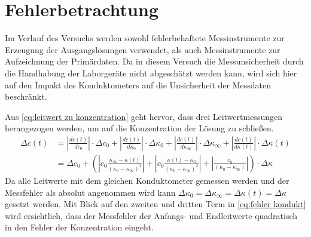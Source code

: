 	\section{Fehlerbetrachtung}
		Im Verlauf des Versuchs werden sowohl fehlerbehaftete Messinstrumente zur Erzeugung der Ausgangslösungen verwendet,
		als auch Messinstrumente zur Aufzeichnung der Primärdaten. Da in diesem Versuch die Messunsicherheit durch die Handhabung
		der Laborgeräte nicht abgeschätzt werden kann, wird sich hier auf den Impakt des Konduktometers auf die Unsicherheit der
		Messdaten beschränkt.\par\medskip
		Aus \cref{eq:leitwert zu konzentration} geht hervor, dass drei Leitwertmessungen herangezogen werden, um auf die Konzentration
		der Lösung zu schließen.
		\begin{align}
			\Delta c(t) &= \left|\frac{dc(t)}{dc_0}\right| \cdot \Delta c_0 + \left| \frac{dc(t)}{d\kappa_0} \right| \cdot \Delta \kappa_0 + \left| \frac{dc(t)}{d\kappa_{\infty}} \right| \cdot \Delta \kappa_{\infty} + \left| \frac{dc(t)}{d\kappa(t)} \right| \cdot \Delta \kappa(t) \nonumber \\
						&= \Delta c_0 + \left( \left| c_0 \frac{\kappa_{\infty} - \kappa(t)}{\left( \kappa_0 - \kappa_{\infty} \right)^2} \right|
						+ \left| c_0 \frac{\kappa(t) - \kappa_0}{\left( \kappa_0 - \kappa_{\infty} \right)^2} \right|
						+ \left| \frac{c_0}{\left( \kappa_0 - \kappa_{\infty} \right)} \right| \right) \cdot \Delta \kappa
			\label{eq:fehler kondukt}
		\end{align}
		Da alle Leitwerte mit dem gleichen Konduktometer gemessen werden und der Messfehler als absolut angenommen wird kann
		\(\Delta \kappa_0 = \Delta \kappa_{\infty} = \Delta \kappa(t) = \Delta \kappa\) gesetzt werden. Mit Blick auf den zweiten und
		dritten Term in \cref{eq:fehler kondukt} wird ersichtlich, dass der Messfehler der Anfangs- und Endleitwerte quadratisch in den
		Fehler der Konzentration eingeht.
